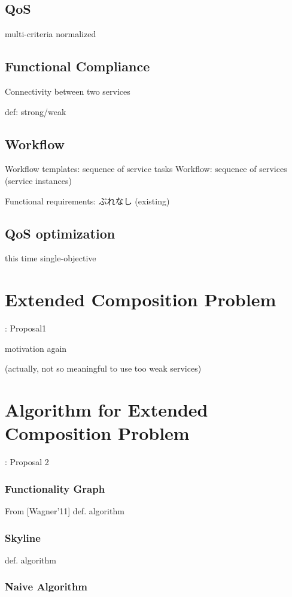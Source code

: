 \documentclass[senior,final,11pt]{iscs-thesis}
\begin{document}
\section{QoS}
multi-criteria
normalized

\section{Functional Compliance}
Connectivity between two services

def: strong/weak

\section{Workflow}
Workflow templates: sequence of service tasks
Workflow: sequence of services (service instances)

Functional requirements: ぶれなし (existing)

\section{QoS optimization}
this time single-objective

\chapter{Extended Composition Problem}: Proposal1

motivation again

(actually, not so meaningful to use too weak services)


\chapter{Algorithm for Extended Composition Problem}: Proposal 2

\subsection{Functionality Graph}
From [Wagner'11]
def.
algorithm

\subsection{Skyline}
def.
algorithm

\subsection{Naive Algorithm}
\end{document}

